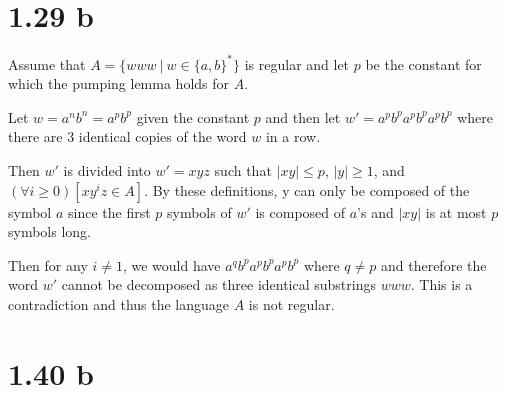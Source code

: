 \documentclass{article}
\begin{document}
\section*{1.29 b}

\quad Assume that $A = \{www \:|\: w \in \{a, b\}^*\}$ is regular and let $p$ be the constant for which the pumping lemma holds for $A$.

\vspace{5mm} 

Let $w = a^nb^n = a^pb^p$ given the constant $p$ and then let $w' = a^pb^pa^pb^pa^pb^p$ where there are 3 identical copies of the word $w$ in a row.

\vspace{5mm} 

Then $w'$ is divided into $w' = xyz$ such that $|xy| \leq p$, $|y| \geq 1$, and $(\forall i \geq 0)[xy^iz \in A]$. By these definitions, y can only be composed of the symbol $a$ since the first $p$ symbols of $w'$ is composed of $a$'s and $|xy|$ is at most $p$ symbols long.

\vspace{5mm}

Then for any $i \neq 1$, we would have $a^qb^pa^pb^pa^pb^p$ where $ q \neq p$ and therefore the word $w'$ cannot be decomposed as three identical substrings $www$. This is a contradiction and thus the language $A$ is not regular.

\section*{1.40 b}
\end{document}
